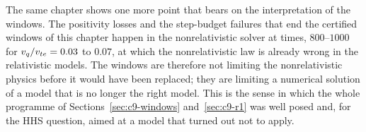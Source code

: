The same chapter shows one more point that bears on the interpretation of the windows. The positivity losses and the step-budget failures that end the certified windows of this chapter happen in the nonrelativistic solver at times, $800$--$1000$ for $v_q/v_{te}=0.03$ to $0.07$, at which the nonrelativistic law is already wrong in the relativistic models. The windows are therefore not limiting the nonrelativistic physics before it would have been replaced; they are limiting a numerical solution of a model that is no longer the right model. This is the sense in which the whole programme of Sections~\ref{sec:c9-windows} and~\ref{sec:c9-r1} was well posed and, for the HHS question, aimed at a model that turned out not to apply.
